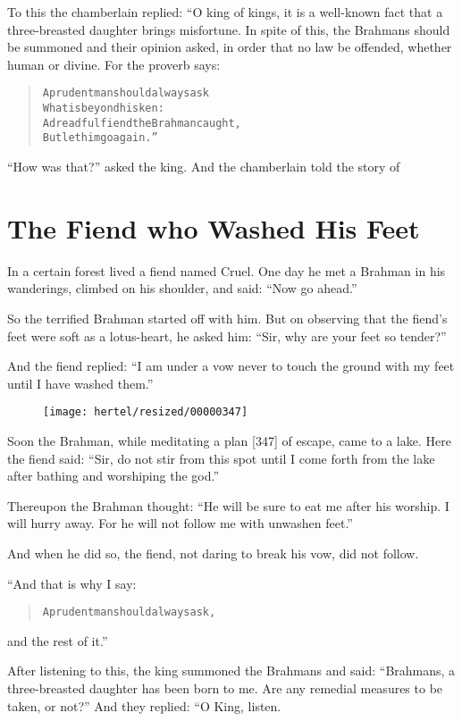 \documentclass[article, twoside, 10pt]{memoir}
\renewenvironment{verbatim}{%
\begin{quote}%
\vskip -10pt%
\begin{alltt}\normalfont\small}{\end{alltt}%
\end{quote}%
\vskip -10pt
} %
\begin{document}
To this the chamberlain replied: “O king of kings, it is a
well-known fact that a three-breasted daughter brings misfortune.
In spite of this, the Brahmans should be summoned and their opinion
asked, in order that no law be offended, whether human or divine.
For the proverb says:

\begin{verbatim}
A prudent man should always ask
    What is beyond his ken:
A dreadful fiend the Brahman caught,
    But let him go again.”
\end{verbatim}
``How was that?'' asked the king. And the chamberlain told the
story of

\chapter{The Fiend who Washed His Feet}

In a certain forest lived a fiend named Cruel. One day he met a
Brahman in his wanderings, climbed on his shoulder, and said:
``Now go ahead.''

So the terrified Brahman started off with him. But on observing
that the fiend's feet were soft as a lotus-heart, he asked him:
``Sir, why are your feet so tender?''

And the fiend replied:
``I am under a vow never to touch the ground with my feet until I have washed them.''
\begin{figure}[p]\texttt{[image: hertel/resized/00000347]}\end{figure}Soon the Brahman, while meditating a plan [347] of escape, came to
a lake. Here the fiend said:
``Sir, do not stir from this spot until I come forth from the lake after bathing and worshiping the god.''

Thereupon the Brahman thought:
``He will be sure to eat me after his worship. I will hurry away. For he will not follow me with unwashen feet.''

And when he did so, the fiend, not daring to break his vow, did not
follow.

“And that is why I say:

\begin{verbatim}
A prudent man should always ask,
\end{verbatim}
and the rest of it.”

After listening to this, the king summoned the Brahmans and said:
``Brahmans, a three-breasted daughter has been born to me. Are any remedial measures to be taken, or not?''
And they replied: “O King, listen.
\end{document}
